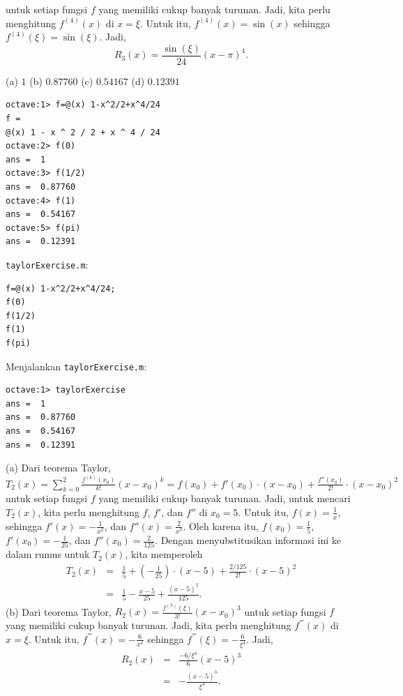 \begin{description}
untuk setiap fungsi $f$ yang memiliki cukup banyak turunan. Jadi,
kita perlu menghitung $f^{(4)}(x)$ di $x=\xi$. Untuk itu, $f^{(4)}(x)=\sin(x)$
sehingga $f^{(4)}(\xi)=\sin(\xi)$. Jadi,
\[
R_{3}(x)=\frac{\sin(\xi)}{24}(x-\pi)^{4}.
\]
\item [{\ref{exc:taylor8}:}] (a) $1$ (b) $0.87760$ (c) $0.54167$ (d)
$0.12391$ \begin{verbatim}
octave:1> f=@(x) 1-x^2/2+x^4/24
f =
@(x) 1 - x ^ 2 / 2 + x ^ 4 / 24
octave:2> f(0)
ans =  1
octave:3> f(1/2)
ans =  0.87760
octave:4> f(1)
ans =  0.54167
octave:5> f(pi)
ans =  0.12391 
\end{verbatim}
\item [{\ref{exc:taylor11}:}] \texttt{taylorExercise.m}: \begin{verbatim}
f=@(x) 1-x^2/2+x^4/24;
f(0)
f(1/2)
f(1)
f(pi)
\end{verbatim}Menjalankan \texttt{taylorExercise.m}: \begin{verbatim}
octave:1> taylorExercise
ans =  1
ans =  0.87760
ans =  0.54167
ans =  0.12391
\end{verbatim}
\item [{\ref{exc:taylor4}:}] (a) Dari teorema Taylor, $T_{2}(x)=\sum_{k=0}^{2}\frac{f^{(k)}(x_{0})}{k!}(x-x_{0})^{k}=f(x_{0})+f'(x_{0})\cdot(x-x_{0})+\frac{f''(x_{0})}{2!}\cdot(x-x_{0})^{2}$
untuk setiap fungsi $f$ yang memiliki cukup banyak turunan. Jadi,
untuk mencari $T_{2}(x)$, kita perlu menghitung $f$, $f'$, dan
$f''$ di $x_{0}=5$. Untuk itu, $f(x)=\frac{1}{x}$, sehingga $f'(x)=-\frac{1}{x^{2}}$,
dan $f''(x)=\frac{2}{x^{3}}$. Oleh karena itu, $f(x_{0})=\frac{1}{5}$,
$f'(x_{0})=-\frac{1}{25}$, dan $f''(x_{0})=\frac{2}{125}$. Dengan
menyubstitusikan informasi ini ke dalam rumus untuk $T_{2}(x)$, kita
memperoleh
\begin{eqnarray*}
T_{2}(x) & = & \frac{1}{5}+\left(-\frac{1}{25}\right)\cdot(x-5)+\frac{2/125}{2!}\cdot(x-5)^{2}\\
 & = & \frac{1}{5}-\frac{x-5}{25}+\frac{(x-5)^{2}}{125}.
\end{eqnarray*}
(b) Dari teorema Taylor, $R_{2}(x)=\frac{f^{(3)}(\xi)}{3!}(x-x_{0})^{3}$
untuk setiap fungsi $f$ yang memiliki cukup banyak turunan. Jadi,
kita perlu menghitung $f^{'''}(x)$ di $x=\xi$. Untuk itu, $f^{'''}(x)=-\frac{6}{x^{4}}$
sehingga $f^{'''}(\xi)=-\frac{6}{\xi^{4}}$. Jadi,
\begin{eqnarray*}
R_{2}(x) & = & \frac{-6/\xi^{4}}{6}(x-5)^{3}\\
 & = & -\frac{(x-5)^{3}}{\xi^{4}}.
\end{eqnarray*}

\end{description}
